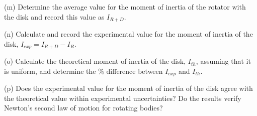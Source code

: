 (m) Determine the average value for the moment of inertia of the rotator with
the disk and record this value as \( I_{R+D} \).
\vspace{10mm}

(n) Calculate and record the experimental value for the moment of inertia of
the disk, \( I_{exp}  = I_{R+D} - I_{R} \).
\vspace{10mm}

(o) Calculate the theoretical moment of inertia of the disk, \( I_{th} \),
assuming that it is uniform, and determine the \% difference between \( I_{exp} \)
and \( I_{th} \).
\vspace{40mm}

(p) Does the experimental value for the moment of inertia of the disk agree
with the theoretical value within experimental uncertainties? Do the results
verify Newton's second law of motion for rotating bodies?

